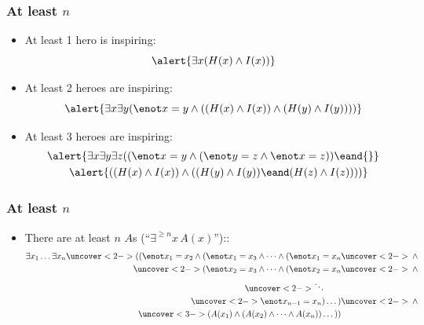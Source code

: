 \begin{frame}
    \frametitle{At least $n$}

\begin{itemize}[<+->]
\item At least 1 hero is inspiring:
\[
\alert{\exists x(H(x) \land I(x))}
\]
\item At least 2 heroes are inspiring:
\[
\alert{\exists x\exists y(\enot x = y \land ((H(x) \land I(x)) \land (H(y) \land I(y))))}
\]
\item At least 3 heroes are inspiring:
\begin{align*}
& \alert{\exists x\exists y\exists z((\enot x = y \land (\enot y = z \land \enot x = z)) \eand {}} \\
& \qquad \alert{((H(x) \land I(x)) \land ((H(y) \land I(y)) \eand (H(z) \land I(z))))}
\end{align*}
\end{itemize}
\end{frame}


\begin{frame}
  \frametitle{At least $n$}

\begin{itemize}
\item There are at least $n$ $A$s (``$\exists^{\ge n} x\,A(x)$'')::
\begin{align*}
\exists x_1\dots\exists x_n\uncover<2->{((\enot x_1 = x_2 \land (\enot x_1 = x_3 \land \dots \land (\enot x_1 = x_n} & \uncover<2->{{} \land {}}\\
\uncover<2->{(\enot x_2 = x_3 \land \dots \land (\enot x_2 = x_n} & \uncover<2->{{} \land {}}\\
\uncover<2->{\ddots}\qquad &\\
\uncover<2->{\enot x_{n-1} = x_n)\dots)} & \uncover<2->{{} \land {}}\\
\uncover<3->{(A(x_1) \land (A(x_2) \land \dots \land A(x_n))\dots))}
\end{align*}
\end{itemize}
\end{frame}

